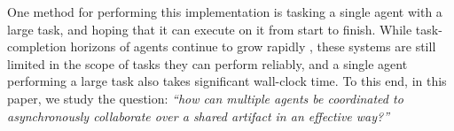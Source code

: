 One method for performing this implementation is tasking a single agent with a large task, and hoping that it can execute on it from start to finish.
While task-completion horizons of agents continue to grow rapidly \citep{kwa2025measuring}, these systems are still limited in the scope of tasks they can perform reliably, and a single agent performing a large task also takes significant wall-clock time.
To this end, in this paper, we study the question: \textit{``how can multiple agents be coordinated to asynchronously collaborate over a shared artifact in an effective way?''}

